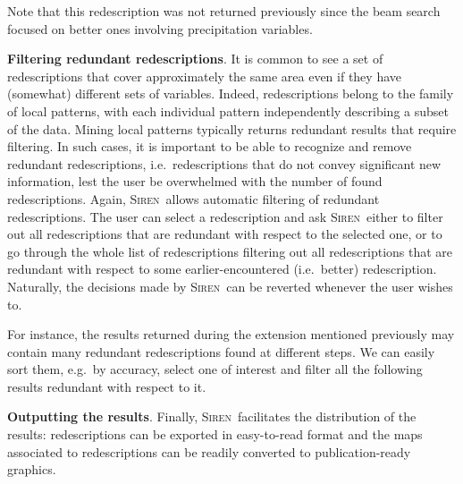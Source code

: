 \documentclass{llncs}
\newcommand{\prg}[1]{\textbf{#1}.}
\newcommand{\Siren}{\textsc{Siren}}
\begin{document}
Note that this redescription was not returned previously since the
beam search focused on better ones involving precipitation variables.




\prg{Filtering redundant redescriptions}
\label{sec:filt-redund-redescr}
It is common to see a set of redescriptions that cover approximately
the same area even if they have (somewhat) different sets of
variables.  Indeed, redescriptions belong to the family of local
patterns, with each individual pattern independently describing a
subset of the data. Mining local patterns typically returns redundant
results that require filtering.  In such cases, it is important to be
able to recognize and remove redundant redescriptions, i.e.\
redescriptions that do not convey significant new information, lest
the user be overwhelmed with the number of found
redescriptions. Again, \Siren\ allows automatic filtering of redundant
redescriptions. The user can select a redescription and ask
\Siren\ either to filter out all redescriptions that are redundant
with respect to the selected one, or to go through the whole list of
redescriptions filtering out all redescriptions that are redundant
with respect to some earlier-encountered (i.e.\ better)
redescription. Naturally, the decisions made by
\Siren\ can be reverted whenever the user wishes to.

For instance, the results returned during the extension
mentioned previously may contain many redundant redescriptions found
at different steps. We can easily sort them, e.g.\ by accuracy, select
one of interest and filter all the following results redundant with respect to it.


\prg{Outputting the results}
\label{sec:outputting-results}
Finally, \Siren\ facilitates the distribution of the results:
redescriptions can be exported in easy-to-read format and the
maps associated to redescriptions can be readily converted to
publication-ready graphics. 
\end{document}
